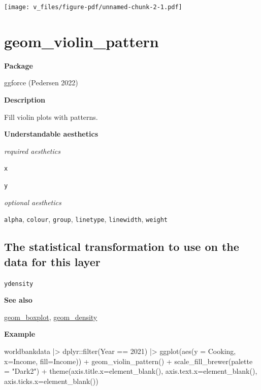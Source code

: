 \documentclass[
  letterpaper,
  DIV=11,
  numbers=noendperiod]{scrreprt}
\newenvironment{Shaded}{\begin{snugshade}}{\end{snugshade}}
\newcommand{\AttributeTok}[1]{\textcolor[rgb]{0.40,0.45,0.13}{#1}}
\newcommand{\DecValTok}[1]{\textcolor[rgb]{0.68,0.00,0.00}{#1}}
\newcommand{\FunctionTok}[1]{\textcolor[rgb]{0.28,0.35,0.67}{#1}}
\newcommand{\NormalTok}[1]{\textcolor[rgb]{0.00,0.23,0.31}{#1}}
\newcommand{\SpecialCharTok}[1]{\textcolor[rgb]{0.37,0.37,0.37}{#1}}
\newcommand{\StringTok}[1]{\textcolor[rgb]{0.13,0.47,0.30}{#1}}
\begin{document}
\texttt{[image: v\_files/figure-pdf/unnamed-chunk-2-1.pdf]}

\section{geom\_violin\_pattern}\label{violin_pattern}

\textbf{Package}

ggforce (Pedersen 2022)

\textbf{Description}

Fill violin plots with patterns.

\textbf{Understandable aesthetics}

\emph{required aesthetics}

\texttt{x}

\texttt{y}

\emph{optional aesthetics}

\texttt{alpha}, \texttt{colour}, \texttt{group}, \texttt{linetype},
\texttt{linewidth}, \texttt{weight}

\subsection{The statistical transformation to use on the data for this
layer}\label{the-statistical-transformation-to-use-on-the-data-for-this-layer-6}

\texttt{ydensity}

\textbf{See also}

\hyperref[boxplot]{geom\_boxplot}, \hyperref[density]{geom\_density}

\textbf{Example}

\begin{Shaded}
\begin{Highlighting}[]
\NormalTok{worldbankdata }\SpecialCharTok{|\textgreater{}}
\NormalTok{  dplyr}\SpecialCharTok{::}\FunctionTok{filter}\NormalTok{(Year }\SpecialCharTok{==} \DecValTok{2021}\NormalTok{) }\SpecialCharTok{|\textgreater{}}
\FunctionTok{ggplot}\NormalTok{(}\FunctionTok{aes}\NormalTok{(}\AttributeTok{y =}\NormalTok{ Cooking, }\AttributeTok{x=}\NormalTok{Income, }\AttributeTok{fill=}\NormalTok{Income)) }\SpecialCharTok{+} 
  \FunctionTok{geom\_violin\_pattern}\NormalTok{() }\SpecialCharTok{+} 
  \FunctionTok{scale\_fill\_brewer}\NormalTok{(}\AttributeTok{palette =} \StringTok{"Dark2"}\NormalTok{) }\SpecialCharTok{+}
  \FunctionTok{theme}\NormalTok{(}\AttributeTok{axis.title.x=}\FunctionTok{element\_blank}\NormalTok{(),}
        \AttributeTok{axis.text.x=}\FunctionTok{element\_blank}\NormalTok{(),}
        \AttributeTok{axis.ticks.x=}\FunctionTok{element\_blank}\NormalTok{())}
\end{Highlighting}
\end{Shaded}
\end{document}
